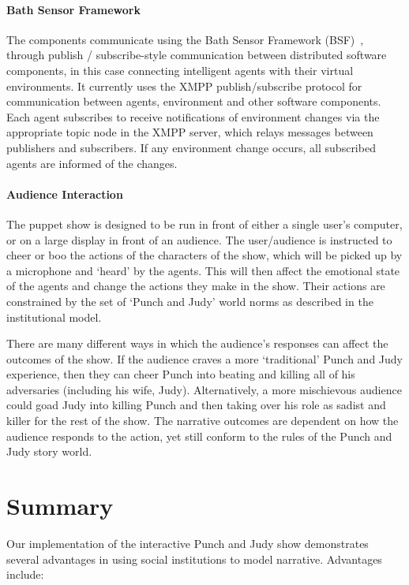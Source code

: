 \documentclass[11pt]{report}
\begin{document}
\paragraph{Bath Sensor Framework} The components communicate using the Bath Sensor Framework
(BSF)~\citep{lee2013decoupling}, through publish / subscribe-style communication between distributed software components, in this case connecting intelligent agents with their virtual environments. It currently uses the XMPP publish/subscribe protocol for communication between agents, environment and other software components. Each agent subscribes to receive notifications of environment changes via the appropriate topic node in the XMPP server, which relays messages between publishers and subscribers. If any environment change occurs, all subscribed agents are informed of the changes.

\paragraph{Audience Interaction} \label{sec:demo}
The puppet show is designed to be run in front of either a single user's computer, or on a large display in front of an audience. The user/audience is instructed to cheer or boo the actions of the characters of the show, which will be picked up by a microphone and `heard' by the agents. This will then affect the emotional state of the agents and change the actions they make in the show. Their actions are constrained by the set of `Punch and Judy' world norms as described in the institutional model.

There are many different ways in which the audience's responses can affect the outcomes of the show. If the audience craves a more `traditional' Punch and Judy experience, then they can cheer Punch into beating and killing all of his adversaries (including his wife, Judy). Alternatively, a more mischievous audience could goad Judy into killing Punch and then taking over his role as sadist and killer for the rest of the show. The narrative outcomes are dependent on how the audience responds to the action, yet still conform to the rules of the Punch and Judy story world.

\section{Summary}
Our implementation of the interactive Punch and Judy show demonstrates several
advantages in using social institutions to model narrative. Advantages include:
\end{document}
